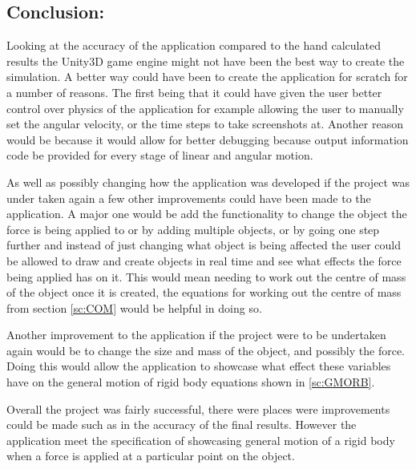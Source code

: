 \subsection{Conclusion:}\label{sc:Con}
Looking at the accuracy of the application compared to the hand calculated results the Unity3D game engine might not have been the best way to create the simulation.
A better way could have been to create the application for scratch for a number of reasons.
The first being that it could have given the user better control over physics of the application for example allowing the user to manually set the angular velocity, or the time steps to take screenshots at.
Another reason would be because it would allow for better debugging because output information code be provided for every stage of linear and angular motion.

As well as possibly changing how the application was developed if the project was under taken again a few other improvements could have been made to the application.
A major one would be add the functionality to change the object the force is being applied to or by adding multiple objects, or by going one step further and instead of just changing what object is being affected the user could be allowed to draw and create objects in real time and see what effects the force being applied has on it.
This would mean needing to work out the centre of mass of the object once it is created, the equations for working out the centre of mass from section \ref{sc:COM} would be helpful in doing so.

Another improvement to the application if the project were to be undertaken again would be to change the size and mass of the object, and possibly the force.
Doing this would allow the application to showcase what effect these variables have on the general motion of rigid body equations shown in \ref{sc:GMORB}.

Overall the project was fairly successful, there were places were improvements could be made such as in the accuracy of the final results.
However the application meet the specification of showcasing general motion of a rigid body when a force is applied at a particular point on the object. 
